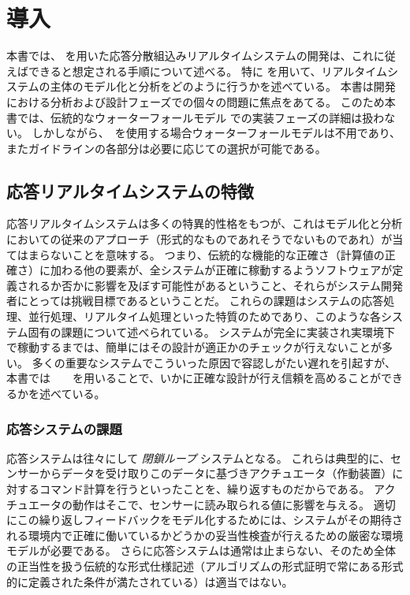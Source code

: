 \documentclass[\pformat,12pt]{jreport}
\begin{document}
\chapter{導入}\label{chap:intro}

本書では、 \VDMTools を用いた応答分散組込みリアルタイムシステムの開発は、これに従えばできると想定される手順について述べる。
特に \VDMTools を用いて、リアルタイムシステムの主体のモデル化と分析をどのように行うかを述べている。
本書は開発における分析および設計フェーズでの個々の問題に焦点をあてる。
このため本書では、伝統的なウォーターフォールモデル \cite{Royce70}での実装フェーズの詳細は扱わない。
しかしながら、\VDMTools\ を使用する場合ウォーターフォールモデルは不用であり、またガイドラインの各部分は必要に応じての選択が可能である。

\section{応答リアルタイムシステムの特徴}

応答リアルタイムシステムは多くの特異的性格をもつが、これはモデル化と分析においての従来のアプローチ（形式的なものであれそうでないものであれ）が当てはまらないことを意味する。
つまり、伝統的な機能的な正確さ（計算値の正確さ）に加わる他の要素が、全システムが正確に稼動するようソフトウェアが定義されるか否かに影響を及ぼす可能性があるということ、それらがシステム開発者にとっては挑戦目標であるということだ。
これらの課題はシステムの応答処理、並行処理、リアルタイム処理といった特質のためであり、このような各システム固有の課題について述べられている。
システムが完全に実装され実環境下で稼動するまでは、簡単にはその設計が適正かのチェックが行えないことが多い。
多くの重要なシステムでこういった原因で容認しがたい遅れを引起すが、本書では　\VDMTools　を用いることで、いかに正確な設計が行え信頼を高めることができるかを述べている。

\subsection{応答システムの課題}

応答システムは往々にして \emph{閉鎖ループ} システムとなる。
これらは典型的に、センサーからデータを受け取りこのデータに基づきアクチュエータ（作動装置）に対するコマンド計算を行うといったことを、繰り返すものだからである。
アクチュエータの動作はそこで、センサーに読み取られる値に影響を与える。
適切にこの繰り返しフィードバックをモデル化するためには、システムがその期待される環境内で正確に働いているかどうかの妥当性検査が行えるための厳密な環境モデルが必要である。
さらに応答システムは通常は止まらない、そのため全体の正当性を扱う伝統的な形式仕様記述（アルゴリズムの形式証明で常にある形式的に定義された条件が満たされている）は適当ではない。
\end{document}
